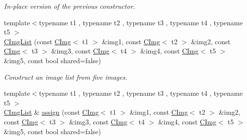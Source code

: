 \begin{DoxyCompactItemize}
\begin{DoxyCompactList}\small\item\em In-\/place version of the previous constructor. \item\end{DoxyCompactList}\item 
\hypertarget{structcimg__library_1_1_c_img_list_a1aad0ea2fe79ae7f5a5685353bb9eb85}{
{\footnotesize template$<$typename t1 , typename t2 , typename t3 , typename t4 , typename t5 $>$ }\\\hyperlink{structcimg__library_1_1_c_img_list_a1aad0ea2fe79ae7f5a5685353bb9eb85}{CImgList} (const \hyperlink{structcimg__library_1_1_c_img}{CImg}$<$ t1 $>$ \&img1, const \hyperlink{structcimg__library_1_1_c_img}{CImg}$<$ t2 $>$ \&img2, const \hyperlink{structcimg__library_1_1_c_img}{CImg}$<$ t3 $>$ \&img3, const \hyperlink{structcimg__library_1_1_c_img}{CImg}$<$ t4 $>$ \&img4, const \hyperlink{structcimg__library_1_1_c_img}{CImg}$<$ t5 $>$ \&img5, const bool shared=false)}
\label{structcimg__library_1_1_c_img_list_a1aad0ea2fe79ae7f5a5685353bb9eb85}

\begin{DoxyCompactList}\small\item\em Construct an image list from five images. \item\end{DoxyCompactList}\item 
\hypertarget{structcimg__library_1_1_c_img_list_aae53c6c2bb8a2633e02e28858b7f95ff}{
{\footnotesize template$<$typename t1 , typename t2 , typename t3 , typename t4 , typename t5 $>$ }\\\hyperlink{structcimg__library_1_1_c_img_list}{CImgList} \& \hyperlink{structcimg__library_1_1_c_img_list_aae53c6c2bb8a2633e02e28858b7f95ff}{assign} (const \hyperlink{structcimg__library_1_1_c_img}{CImg}$<$ t1 $>$ \&img1, const \hyperlink{structcimg__library_1_1_c_img}{CImg}$<$ t2 $>$ \&img2, const \hyperlink{structcimg__library_1_1_c_img}{CImg}$<$ t3 $>$ \&img3, const \hyperlink{structcimg__library_1_1_c_img}{CImg}$<$ t4 $>$ \&img4, const \hyperlink{structcimg__library_1_1_c_img}{CImg}$<$ t5 $>$ \&img5, const bool shared=false)}
\label{structcimg__library_1_1_c_img_list_aae53c6c2bb8a2633e02e28858b7f95ff}


\end{DoxyCompactItemize}

